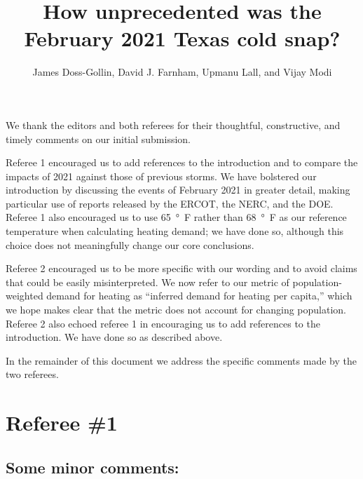 \documentclass{ar2rc}
\title{How unprecedented was the February 2021 Texas cold snap?}
\author{James Doss-Gollin, David J. Farnham, Upmanu Lall, and Vijay Modi}
\begin{document}
\maketitle

We thank the editors and both referees for their thoughtful, constructive, and timely comments on our initial submission.

Referee 1 encouraged us to add references to the introduction and to compare the impacts of 2021 against those of previous storms.
We have bolstered our introduction by discussing the events of February 2021 in greater detail, making particular use of reports released by the ERCOT, the NERC, and the DOE.
Referee 1 also encouraged us to use \SI{65}{\degree F} rather than \SI{68}{\degree F} as our reference temperature when calculating heating demand; we have done so, although this choice does not meaningfully change our core conclusions.

Referee 2 encouraged us to be more specific with our wording and to avoid claims that could be easily misinterpreted.
We now refer to our metric of population-weighted demand for heating as ``inferred demand for heating per capita,'' which we hope makes clear that the metric does not account for changing population.
Referee 2 also echoed referee 1 in encouraging us to add references to the introduction.
We have done so as described above.

In the remainder of this document we address the specific comments made by the two referees.

\section{Referee \#1}



\subsection{Some minor comments:}
\end{document}
